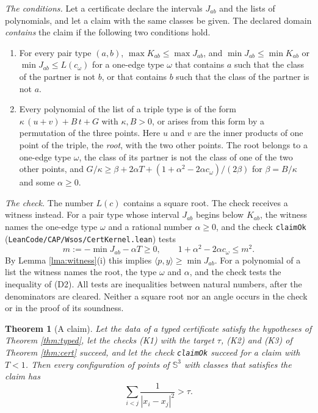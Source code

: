 \documentclass[reqno,a4paper,11pt]{amsart}
\numberwithin{equation}{section}
\newtheorem{theorem}{Theorem}[section]
\newcommand{\Sph}{\mathbb{S}}
\newcommand{\lean}[1]{\texttt{#1}}
\newcommand{\file}[1]{\nolinkurl{#1}}
\begin{document}
\emph{The conditions.} Let a certificate declare the intervals $J_{ab}$ and the lists of polynomials, and let a claim with the same classes be given. The declared domain \emph{contains} the claim if the following two conditions hold.
\begin{enumerate}
    \item[(D1)] For every pair type $(a,b)$, $\max K_{ab} \leq \max J_{ab}$, and $\min J_{ab} \leq \min K_{ab}$ or $\min J_{ab} \leq L(c_\omega)$ for a one-edge type $\omega$ that contains $a$ such that the class of the partner is not $b$, or that contains $b$ such that the class of the partner is not $a$.
    \item[(D2)] Every polynomial of the list of a triple type is of the form $\kappa \, (u + v) + B \, t + G$ with $\kappa, B > 0$, or arises from this form by a permutation of the three points. Here $u$ and $v$ are the inner products of one point of the triple, the \emph{root}, with the two other points. The root belongs to a one-edge type $\omega$, the class of its partner is not the class of one of the two other points, and $G/\kappa \geq \beta + 2 \alpha T + (1 + \alpha^2 - 2 \alpha c_\omega)/(2\beta)$ for $\beta = B/\kappa$ and some $\alpha \geq 0$.
\end{enumerate}

\emph{The check.} The number $L(c)$ contains a square root. The check receives a witness instead. For a pair type whose interval $J_{ab}$ begins below $K_{ab}$, the witness names the one-edge type $\omega$ and a rational number $\alpha \geq 0$, and the check \lean{claimOk} (\file{LeanCode/CAP/Wsos/CertKernel.lean}) tests
$$
m := - \min J_{ab} - \alpha T \geq 0, \qquad 1 + \alpha^2 - 2 \alpha c_\omega \leq m^2 .
$$
By Lemma \ref{lma:witness}(i) this implies $\langle p, y \rangle \geq \min J_{ab}$. For a polynomial of a list the witness names the root, the type $\omega$ and $\alpha$, and the check tests the inequality of (D2). All tests are inequalities between natural numbers, after the denominators are cleared. Neither a square root nor an angle occurs in the check or in the proof of its soundness.

\begin{theorem}[A claim]\label{thm:claim}
Let the data of a typed certificate satisfy the hypotheses of Theorem \ref{thm:typed}, let the checks \textup{(K1)} with the target $\tau$, \textup{(K2)} and \textup{(K3)} of Theorem \ref{thm:cert} succeed, and let the check \lean{claimOk} succeed for a claim with $T < 1$. Then every configuration of points of $\Sph^3$ with classes that satisfies the claim has
$$
\sum_{i<j} \frac{1}{|x_i - x_j|^2} > \tau .
$$
\end{theorem}
\end{document}
